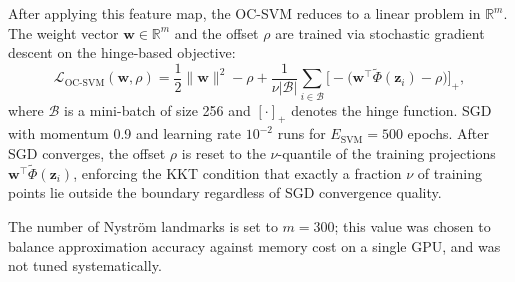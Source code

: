 \documentclass[11pt]{report}
\begin{document}
After applying this feature map, the OC-SVM reduces to a linear problem in $\mathbb{R}^m$. The weight vector $\mathbf{w} \in \mathbb{R}^m$ and the offset $\rho$ are trained via stochastic gradient descent on the hinge-based objective:
\begin{equation}
  \label{eq:ocsvm_sgd}
  \mathcal{L}_{\text{OC-SVM}}(\mathbf{w}, \rho) = \frac{1}{2}\|\mathbf{w}\|^2 - \rho + \frac{1}{\nu |\mathcal{B}|} \sum_{i \in \mathcal{B}} \bigl[-\bigl(\mathbf{w}^\top \tilde{\Phi}(\mathbf{z}_i) - \rho\bigr)\bigr]_+,
\end{equation}
where $\mathcal{B}$ is a mini-batch of size 256 and $[\cdot]_+$ denotes the hinge function. SGD with momentum 0.9 and learning rate $10^{-2}$ runs for $E_{\text{SVM}} = 500$ epochs. After SGD converges, the offset $\rho$ is reset to the $\nu$-quantile of the training projections $\mathbf{w}^\top \tilde{\Phi}(\mathbf{z}_i)$, enforcing the KKT condition that exactly a fraction $\nu$ of training points lie outside the boundary regardless of SGD convergence quality.

The number of Nystr\"om landmarks is set to $m = 300$; this value was chosen to balance approximation accuracy against memory cost on a single GPU, and was not tuned systematically.
\end{document}
